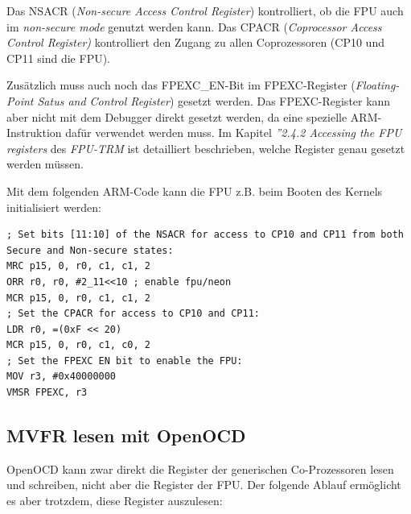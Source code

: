 Das NSACR (\textit{Non-secure Access Control Register}) kontrolliert, ob die FPU auch im \textit{non-secure mode} genutzt werden kann.
Das CPACR (\textit{Coprocessor Access Control Register)} kontrolliert den Zugang zu allen Coprozessoren (CP10 und CP11 sind die FPU).

Zusätzlich muss auch noch das FPEXC\_EN-Bit im FPEXC-Register (\textit{Floating-Point Satus and Control Register}) gesetzt werden.
Das FPEXC-Register kann aber nicht mit dem Debugger direkt gesetzt werden, da eine spezielle ARM-Instruktion dafür verwendet werden muss.
Im Kapitel \textit{''2.4.2 Accessing the FPU registers} des \textit{FPU-TRM}\cite{bib:FPUTechnicalReferenceManual} ist detailliert beschrieben, welche Register genau gesetzt werden müssen.

Mit dem folgenden ARM-Code kann die FPU z.B. beim Booten des Kernels initialisiert werden:

\lstset{language=[x86masm]Assembler}
\begin{lstlisting}[frame=single]
; Set bits [11:10] of the NSACR for access to CP10 and CP11 from both Secure and Non-secure states:
MRC p15, 0, r0, c1, c1, 2
ORR r0, r0, #2_11<<10 ; enable fpu/neon
MCR p15, 0, r0, c1, c1, 2
; Set the CPACR for access to CP10 and CP11:
LDR r0, =(0xF << 20)
MCR p15, 0, r0, c1, c0, 2
; Set the FPEXC EN bit to enable the FPU:
MOV r3, #0x40000000
VMSR FPEXC, r3
\end{lstlisting}


\subsection{MVFR lesen mit OpenOCD}
OpenOCD kann zwar direkt die Register der generischen Co-Prozessoren lesen und schreiben, nicht aber die Register der FPU.
Der folgende Ablauf ermöglicht es aber trotzdem, diese Register auszulesen:

